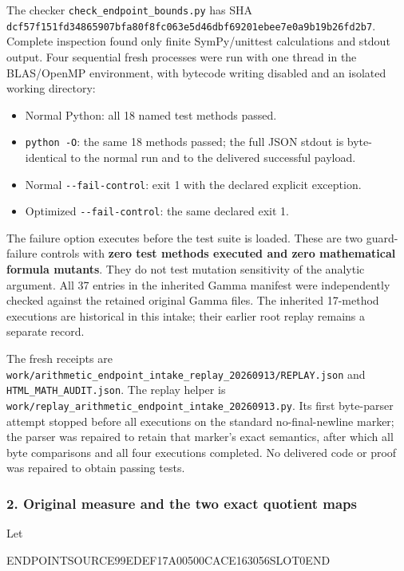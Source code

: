 The checker \texttt{check\_endpoint\_bounds.py} has SHA \texttt{dcf57f151fd34865907bfa80f8fc063e5d46dbf69201ebee7e0a9b19b26fd2b7}. Complete inspection found only finite SymPy/unittest calculations and stdout output. Four sequential fresh processes were run with one thread in the BLAS/OpenMP environment, with bytecode writing disabled and an isolated working directory:

\begin{itemize}
\tightlist
\item
  Normal Python: all 18 named test methods passed.
\item
  \texttt{python\ -O}: the same 18 methods passed; the full JSON stdout is byte-identical to the normal run and to the delivered successful payload.
\item
  Normal \texttt{-\/-fail-control}: exit 1 with the declared explicit exception.
\item
  Optimized \texttt{-\/-fail-control}: the same declared exit 1.
\end{itemize}

The failure option executes before the test suite is loaded. These are two guard-failure controls with \textbf{zero test methods executed and zero mathematical formula mutants}. They do not test mutation sensitivity of the analytic argument. All 37 entries in the inherited Gamma manifest were independently checked against the retained original Gamma files. The inherited 17-method executions are historical in this intake; their earlier root replay remains a separate record.

The fresh receipts are \texttt{work/arithmetic\_endpoint\_intake\_replay\_20260913/REPLAY.json} and \texttt{HTML\_MATH\_AUDIT.json}. The replay helper is \texttt{work/replay\_arithmetic\_endpoint\_intake\_20260913.py}. Its first byte-parser attempt stopped before all executions on the standard no-final-newline marker; the parser was repaired to retain that marker's exact semantics, after which all byte comparisons and all four executions completed. No delivered code or proof was repaired to obtain passing tests.

\subsubsection{2. Original measure and the two exact quotient maps}\label{endpoint-arithmetic_intake--original-measure-and-the-two-exact-quotient-maps}

Let

ENDPOINTSOURCE99EDEF17A00500CACE163056SLOT0END

